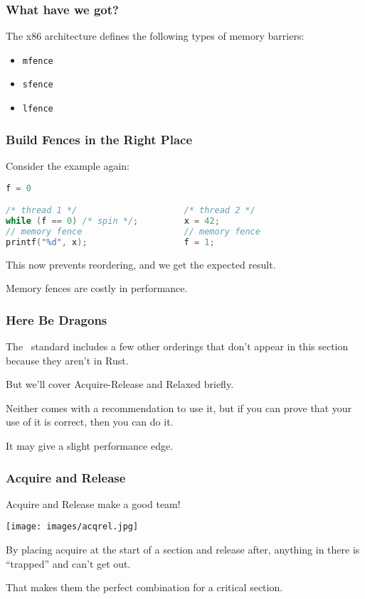 \begin{frame}
\frametitle{What have we got?}

The x86 architecture defines the following types of memory 
barriers:

\begin{itemize}
\item {\tt mfence}
\item {\tt sfence}
\item {\tt lfence}
\end{itemize}

\end{frame}


\begin{frame}[fragile]
\frametitle{Build Fences in the Right Place}

Consider the example again:
  \begin{lstlisting}[language=C]
                         f = 0

/* thread 1 */                     /* thread 2 */
while (f == 0) /* spin */;         x = 42;
// memory fence                    // memory fence
printf("%d", x);                   f = 1;
  \end{lstlisting}
This now prevents reordering, and we get the expected result.

Memory fences are costly in performance.

\end{frame}


\begin{frame}
\frametitle{Here Be Dragons}
The \CPP~standard includes a few other orderings that don't appear in this section because they aren't in Rust. 

But we'll cover Acquire-Release and Relaxed briefly. 

Neither comes with a recommendation to use it, but if you can prove that your use of it is correct, then you can do it. 

It may give a slight performance edge.


\end{frame}


\begin{frame}
\frametitle{Acquire and Release}

Acquire and Release make a good team! 

\begin{center}
	\texttt{[image: images/acqrel.jpg]}
\end{center}

By placing acquire at the start of a section and release after, anything in there is ``trapped'' and can't get out.

That makes them the perfect combination for a critical section.

\end{frame}


